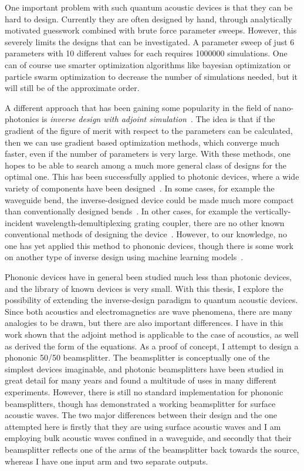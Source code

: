 One important problem with such quantum acoustic devices is that they can be hard to design.
Currently they are often designed by hand,
through analytically motivated guesswork combined with brute force parameter
sweeps.
However, this severely limits the designs that can be investigated.
A parameter sweep of just 6 parameters with 10 different values for each
requires \num{1000000} simulations.
One can of course use smarter optimization algorithms like bayesian optimization
or particle swarm optimization\cite{schneider2019benchmarking,zhang_compact_2013}
to decrease the number of simulations needed, but it will still be of the
approximate order.

A different approach that has been gaining some popularity in the field of
nano-photonics is \emph{inverse design with adjoint
simulation}~\cite{molesky_inverse_2018}.
The idea is that if the gradient of the figure of merit
with respect to the parameters can be calculated, then we can use gradient based
optimization methods, which converge much faster, even if the number of
parameters is very large. With these methods, one hopes to be able to search
among a much more general class of designs for the optimal one.
This has been successfully applied to photonic devices,
where a wide variety of components have been designed~\cite{spins2019}.
In some cases, for example the waveguide bend, the inverse-designed device could
be made much more compact than conventionally designed
bends~\cite{jensen_systematic_2004}.
In other cases, for example the vertically-incident wavelength-demultiplexing
grating coupler, there are no other known conventional methods of designing the
device~\cite{piggott_inverse_2014}.
However, to our knowledge, no one has yet applied this method to phononic
devices, though there is some work on another type of inverse design using
machine learning models~\cite{han_deep-learning-based_2022}.


Phononic devices have in general been studied much less than photonic
devices, and the library of known devices is very small.
With this thesis, I explore the possibility of extending the inverse-design paradigm to
quantum acoustic devices.
Since both acoustics and electromagnetics are wave phenomena, there are many
analogies to be drawn, but there are also important differences.
I have in this work shown that the adjoint method is applicable to the case of
acoustics, as well as derived the form of the equations.
As a proof of concept, I attempt to design a phononic 50/50 beamsplitter.
The beamsplitter is conceptually one of the simplest devices imaginable,
and photonic beamsplitters have been studied in great detail for many years
and found a multitude of uses in many different experiments.
However, there is still no standard implementation for phononic beamsplitters,
though \cite{qiao2023developing} has demonstrated a working beamsplitter for
surface acoustic waves.
The two major differences between their design and the one attempted here is
firstly that they are using surface acoustic waves and I am employing bulk
acoustic waves confined in a waveguide, and secondly that their beamsplitter
reflects one of the arms of the beamsplitter back towards the source, whereas I
have one input arm and two separate outputs.

